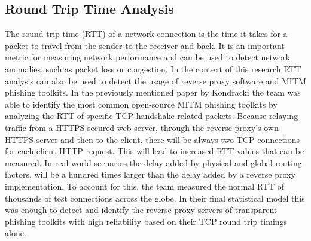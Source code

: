 \documentclass[12pt]{scrbook}
\begin{document}
\subsection{Round Trip Time Analysis}
The round trip time (RTT) of a network connection is the time it takes for a
packet to travel from the sender to the receiver and back. It is an important
metric for measuring network performance and can be used to detect network
anomalies, such as packet loss or congestion.
In the context of this research RTT analysis can also be used to detect
the usage of reverse proxy software and MITM phishing toolkits.
In the previously mentioned paper by Kondracki the team was able to identify
the most common open-source MITM phishing toolkits by analyzing the RTT of
specific TCP handshake related packets. Because relaying traffic from a HTTPS
secured web server, through the reverse proxy's own HTTPS server and then to the client,
there will be always two TCP connections for each client HTTP request.
This will lead to increased RTT values that can be measured.
In real world scenarios the delay added by physical and global routing factors,
will be a hundred times larger than the delay added by a reverse proxy implementation.
To account for this, the team measured the normal RTT of thousands of test
connections across the globe. In their final statistical model this was enough to detect and
identify the reverse proxy servers of transparent phishing toolkits with high reliability
based on their TCP round trip timings alone.
\end{document}
